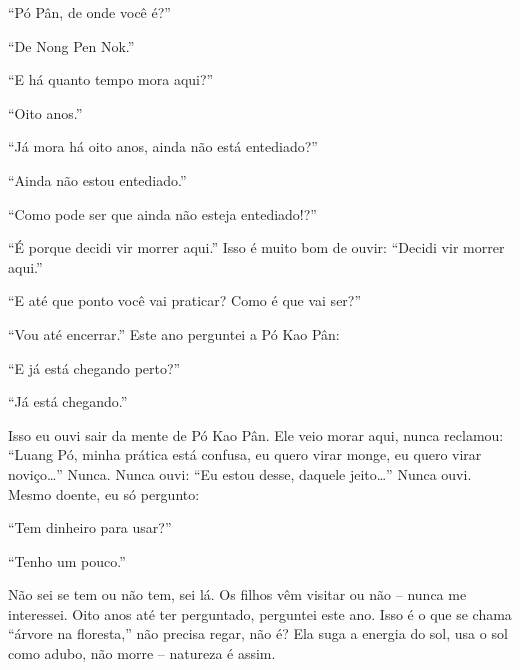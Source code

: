 “Pó Pân, de onde você é?” 

“De Nong Pen Nok.”

“E há quanto tempo mora aqui?”

“Oito anos.” 

“Já mora há oito anos, ainda não está entediado?” 

“Ainda não estou entediado.”

“Como pode ser que ainda não esteja entediado!?”

“É porque decidi vir morrer aqui.” Isso é muito bom de ouvir:
“Decidi vir morrer aqui.” 

“E até que ponto você vai praticar? Como é que vai ser?”

“Vou até encerrar.” Este ano perguntei a Pó Kao Pân:

“E já está chegando perto?”

“Já está chegando.” 

Isso eu ouvi sair da mente de Pó Kao Pân. Ele veio morar aqui, nunca
reclamou: “Luang Pó, minha prática está confusa, eu quero virar monge,
eu quero virar noviço\ldots{}” Nunca. Nunca ouvi: “Eu estou desse, daquele
jeito\ldots{}” Nunca ouvi. Mesmo doente, eu só pergunto:

“Tem dinheiro para usar?” 

“Tenho um pouco.” 

Não sei se tem ou não tem, sei lá. Os filhos vêm visitar ou não –
nunca me interessei. Oito anos até ter perguntado, perguntei este ano.
Isso é o que se chama “árvore na floresta,” não precisa regar, não é?
Ela suga a energia do sol, usa o sol como adubo, não morre – natureza é
assim.

